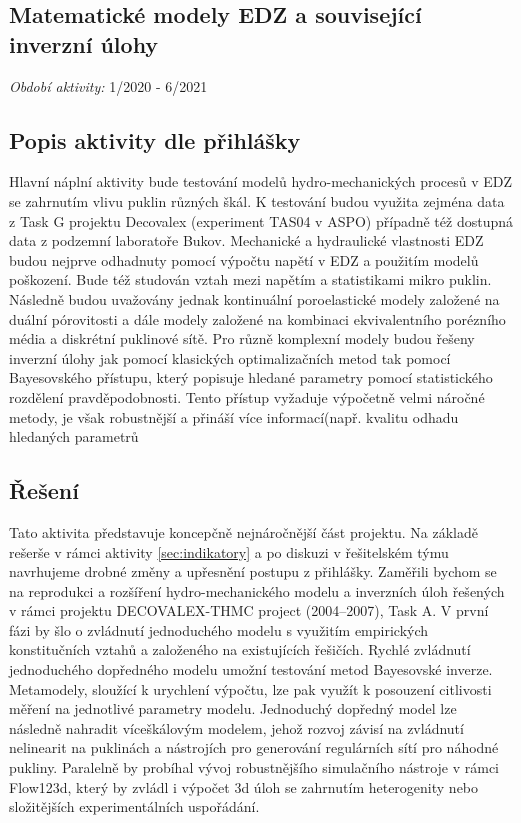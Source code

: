 \documentclass[11pt,a4paper]{article}
\begin{document}
\begin{onehalfspacing}
\section{ Matematické modely EDZ a související inverzní úlohy}
\label{sec:hm_modely}
 {\it Období aktivity:}  1/2020 - 6/2021
\subsection{Popis aktivity dle přihlášky}
Hlavní náplní aktivity bude testování modelů hydro-mechanických procesů v EDZ se zahrnutím vlivu puklin různých škál. K testování budou využita zejména data z Task G projektu Decovalex (experiment TAS04 v ASPO) případně též dostupná data z podzemní
laboratoře Bukov. Mechanické a hydraulické vlastnosti EDZ budou nejprve odhadnuty pomocí výpočtu napětí v EDZ a použitím modelů poškození. Bude též studován vztah mezi napětím a statistikami mikro puklin. Následně budou uvažovány jednak kontinuální poroelastické modely založené na duální pórovitosti a dále modely založené na kombinaci ekvivalentního porézního média a diskrétní puklinové sítě. Pro různě komplexní modely budou řešeny inverzní úlohy jak pomocí klasických optimalizačních metod tak pomocí
Bayesovského přístupu, který popisuje hledané parametry pomocí statistického rozdělení pravděpodobnosti. Tento přístup vyžaduje výpočetně velmi náročné metody, je však robustnější a přináší více informací(např. kvalitu odhadu hledaných parametrů

\subsection{Řešení}
Tato aktivita představuje koncepčně nejnáročnější část projektu. Na základě rešerše v rámci aktivity \ref{sec:indikatory} 
a po diskuzi v řešitelském týmu navrhujeme drobné změny a upřesnění postupu z přihlášky. Zaměřili bychom se na reprodukci a rozšíření 
hydro-mechanického modelu a inverzních úloh řešených v rámci projektu DECOVALEX-THMC project (2004–2007), Task A. 
V první fázi by šlo o zvládnutí jednoduchého modelu s využitím empirických konstitučních vztahů a založeného na existujících řešičích. 
Rychlé zvládnutí jednoduchého dopředného modelu umožní testování metod Bayesovské inverze. Metamodely, sloužící k urychlení 
výpočtu, lze pak využít k posouzení citlivosti měření na jednotlivé parametry modelu. Jednoduchý dopředný model lze následně nahradit 
víceškálovým modelem, jehož rozvoj závisí na zvládnutí nelinearit na puklinách a nástrojích pro generování regulárních sítí pro náhodné pukliny.  
Paralelně by probíhal vývoj robustnějšího simulačního nástroje v rámci Flow123d,
který by zvládl i výpočet 3d úloh se zahrnutím heterogenity nebo složitějších experimentálních uspořádání.  


\end{onehalfspacing}
\end{document}

